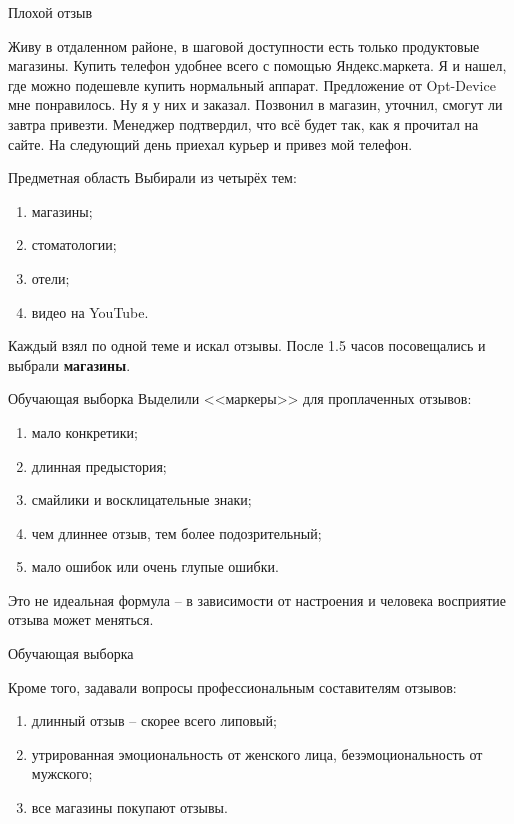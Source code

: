 \documentclass[mathserif,utf8,14pt]{beamer}
\begin{document}
\begin{frame}{Плохой отзыв}

     \addtocounter{framenumber}{-1}
                Живу в отдаленном районе, в шаговой доступности есть 
                только продуктовые магазины. 
                Купить телефон удобнее всего с помощью Яндекс.маркета. 
                Я и нашел, 
                где можно подешевле купить нормальный аппарат. 
                Предложение от Opt-Device мне понравилось. 
                Ну я у них и заказал. Позвонил в магазин, уточнил, смогут ли завтра привезти. 
                Менеджер подтвердил, что всё будет так, как я прочитал на сайте. 
                На следующий день приехал курьер и привез мой телефон.
\end{frame}

\begin{frame}{Предметная область}
    Выбирали из четырёх тем:
    \begin{enumerate}
        \item магазины;
        \item стоматологии;
        \item отели;
        \item видео на YouTube.
    \end{enumerate}
    Каждый взял по одной теме и искал отзывы. После 1.5 часов посовещались
    и выбрали \textbf{магазины}.
\end{frame}

\begin{frame}{Обучающая выборка}
    Выделили <<маркеры>> для проплаченных отзывов:
    \begin{enumerate}
        \item мало конкретики;
        \item длинная предыстория;
        \item смайлики и восклицательные знаки;
        \item чем длиннее отзыв, тем более подозрительный;
        \item мало ошибок или очень глупые ошибки.
    \end{enumerate}
    Это не идеальная формула -- в зависимости от настроения и человека 
    восприятие отзыва может
    меняться. \\
\end{frame}

\begin{frame}{Обучающая выборка}
     \addtocounter{framenumber}{-1}
    Кроме того, задавали вопросы профессиональным составителям отзывов:
    \begin{enumerate}
        \item длинный отзыв -- скорее всего липовый;
        \item утрированная эмоциональность от женского лица, безэмоциональность
            от мужского;
        \item все магазины покупают отзывы. 
    \end{enumerate}
\end{frame}
\end{document}
